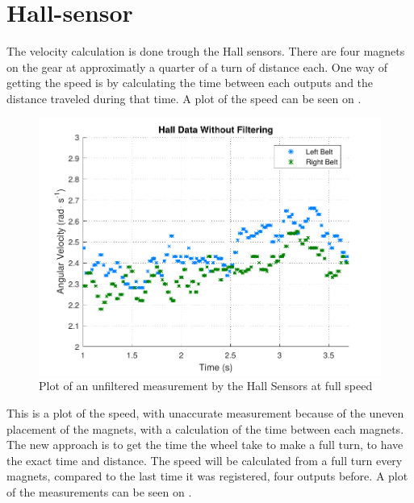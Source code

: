 \section{Hall-sensor}

The velocity calculation is done trough the Hall sensors. There are four magnets on the gear at approximatly a quarter of a turn of distance each. One way of getting the speed is by calculating the time between each outputs and the distance traveled during that time. A plot of the speed can be seen on .

\begin{figure}[H]
	\centering
	\includegraphics[scale=0.9]{figures/unfilteredHall.pdf}
	\caption{Plot of an unfiltered measurement by the Hall Sensors at full speed}
	\label{unfilteredHall}
\end{figure}


This is a plot of the speed, with unaccurate measurement because of the uneven placement of the magnets, with a calculation of the time between each magnets.\\


The new approach is to get the time the wheel take to make a full turn, to have the exact time and distance. The speed will be calculated from a full turn every magnets, compared to the last time it was registered, four outputs before. A plot of the measurements can be seen on .

